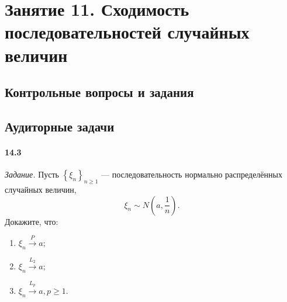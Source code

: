 \chapter*{Занятие 11. Сходимость последовательностей случайных величин}

\section*{Контрольные вопросы и задания}

\section*{Аудиторные задачи}

\subsubsection*{14.3}

\textit{Задание.} Пусть $ \left\{ \xi_n \right\}_{n \geq 1}$ --- последовательность нормально распределённых случайных величин,
$$ \xi_n \sim N \left( a, \frac{1}{n} \right).$$
Докажите, что:
\begin{enumerate}[label=\alph*)]
\item $ \xi_n \overset{P}{ \rightarrow } a;$
\item $ \xi_n \overset{L_2}{ \rightarrow } a;$
\item $ \xi_n \overset{L_p}{ \rightarrow } a, p \geq 1$.
\end{enumerate}


